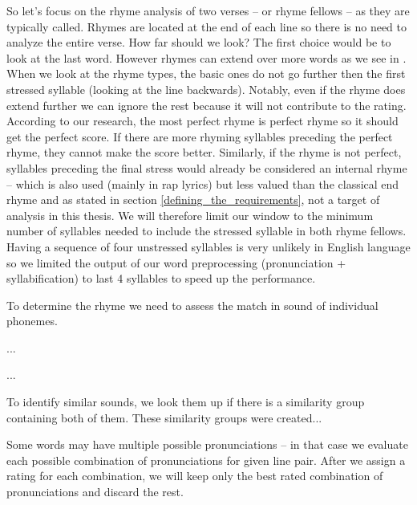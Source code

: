So let's focus on the rhyme analysis of two verses -- or rhyme fellows -- as they are typically called. Rhymes are located at the end of each line so there is no need to analyze the entire verse. How far should we look? The first choice would be to look at the last word. However rhymes can extend over more words as we see in . When we look at the rhyme types, the basic ones do not go further then the first stressed syllable (looking at the line backwards). Notably, even if the rhyme does extend further we can ignore the rest because it will not contribute to the rating. According to our research, the most perfect rhyme is perfect rhyme so it should get the perfect score. If there are more rhyming syllables preceding the perfect rhyme, they cannot make the score better. Similarly, if the rhyme is not perfect, syllables preceding the final stress would already be considered an internal rhyme -- which is also used (mainly in rap lyrics) but less valued than the classical end rhyme and as stated in section \ref{defining_the_requirements}, not a target of analysis in this thesis. We will therefore limit our window to the minimum number of syllables needed to include the stressed syllable in both rhyme fellows. Having a sequence of four unstressed syllables is very unlikely in English language so we limited the output of our word preprocessing (pronunciation + syllabification) to last 4 syllables to speed up the performance.

To determine the rhyme we need to assess the match in sound of individual phonemes.

...

...

To identify similar sounds, we look them up if there is a similarity group containing both of them. These similarity groups were created... 

 Some words may have multiple possible pronunciations -- in that case we evaluate each possible combination of pronunciations for given line pair. After we assign a rating for each combination, we will keep only the best rated combination of pronunciations and discard the rest. 


